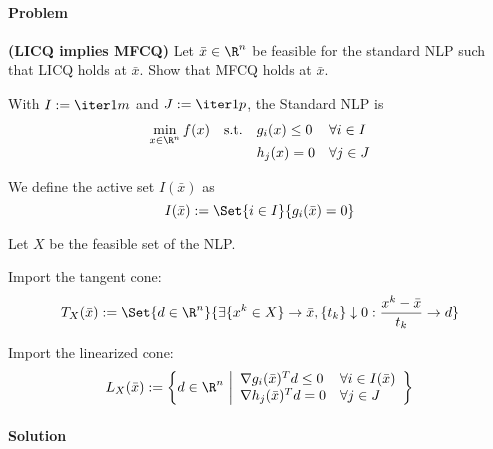\paragraph{Problem} \textbf{(LICQ implies MFCQ)} Let $\bar x\in\R^n$
be feasible for the standard NLP such that LICQ holds at $\bar x$.
Show that MFCQ holds at $\bar x$.

With $I:=\iter1m$ and $J:=\iter1p$, the Standard NLP is
\begin{equation}
	\begin{array}{l l l l}
		\displaystyle \min_{x\in\R^n}f(x)
		 & \text{s.t.} & g_i(x)\leq0 & \forall i\in I \\
		 &             & h_j(x)=0    & \forall j\in J
	\end{array}
\end{equation}

We define the active set $I(\bar x)$ as
$$
	I(\bar x):=\Set{i\in I}{g_i(\bar x)=0}
$$

Let $X$ be the feasible set of the NLP.

Import the tangent cone:
$$
	T_X(\bar x):=
	\Set{d\in\R^n}{\exists \{x^k\in X\}\to\bar x,\{t_k\}\downarrow0:\frac{x^k-\bar x}{t_k}\to d}
$$

Import the linearized cone:
$$
	L_X(\bar x):=\left\{ d\in\R^n\ \middle\vert
	\begin{array}{l l}
		\nabla g_i(\bar x)^Td\leq0 & \forall i\in I(\bar x) \\
		\nabla h_j(\bar x)^Td=0    & \forall j\in J
	\end{array}
	\right\}
$$

\paragraph{Solution}
